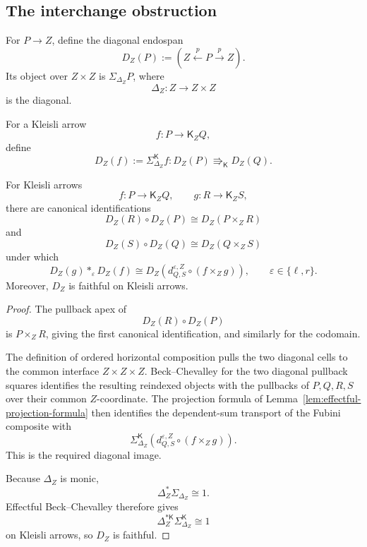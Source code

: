 \subsection{The interchange obstruction}
\label{subsec:effectful-interchange-obstruction}

For \(P\to Z\), define the diagonal endospan
\[
    D_Z(P)
    :=
    \left(
        Z\xleftarrow{p}P\xrightarrow{p}Z
    \right).
\]
Its object over \(Z\times Z\) is \(\Sigma_{\Delta_Z}P\), where
\[
    \Delta_Z:Z\to Z\times Z
\]
is the diagonal.

For a Kleisli arrow
\[
    f:P\to\mathsf K_ZQ,
\]
define
\[
    D_Z(f)
    :=
    \Sigma_{\Delta_Z}^{\mathsf K}f:
    D_Z(P)\Rrightarrow_{\mathsf K}D_Z(Q).
\]

\begin{lemma}
\label{lem:diagonal-recovery-fubini}
For Kleisli arrows
\[
    f:P\to\mathsf K_ZQ,
    \qquad
    g:R\to\mathsf K_ZS,
\]
there are canonical identifications
\[
    D_Z(R)\circ D_Z(P)
    \cong
    D_Z(P\times_ZR)
\]
and
\[
    D_Z(S)\circ D_Z(Q)
    \cong
    D_Z(Q\times_ZS)
\]
under which
\[
    D_Z(g)\ast_\varepsilon D_Z(f)
    \cong
    D_Z
    \left(
        d^{\varepsilon,Z}_{Q,S}
        \circ
        (f\times_Zg)
    \right),
    \qquad
    \varepsilon\in\{\ell,r\}.
\]
Moreover, \(D_Z\) is faithful on Kleisli arrows.
\end{lemma}

\begin{proof}
The pullback apex of
\[
    D_Z(R)\circ D_Z(P)
\]
is \(P\times_ZR\), giving the first canonical identification, and similarly
for the codomain.

The definition of ordered horizontal composition pulls the two diagonal
cells to the common interface \(Z\times Z\times Z\).  Beck--Chevalley for the
two diagonal pullback squares identifies the resulting reindexed objects
with the pullbacks of \(P,Q,R,S\) over their common \(Z\)-coordinate.
The projection formula of
Lemma~\ref{lem:effectful-projection-formula} then identifies the
dependent-sum transport of the Fubini composite with
\[
    \Sigma_{\Delta_Z}^{\mathsf K}
    \left(
        d^{\varepsilon,Z}_{Q,S}
        \circ
        (f\times_Zg)
    \right).
\]
This is the required diagonal image.

Because \(\Delta_Z\) is monic,
\[
    \Delta_Z^*\Sigma_{\Delta_Z}\cong1.
\]
Effectful Beck--Chevalley therefore gives
\[
    \Delta_Z^{*\mathsf K}
    \Sigma_{\Delta_Z}^{\mathsf K}
    \cong1
\]
on Kleisli arrows, so \(D_Z\) is faithful.
\end{proof}

